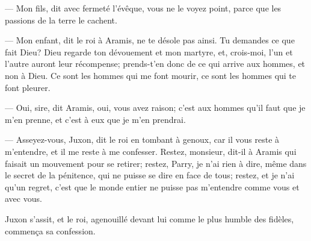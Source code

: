 — Mon fils, dit avec fermeté l'évêque, vous ne le voyez point, parce que les passions de la terre le cachent.

— Mon enfant, dit le roi à Aramis, ne te désole pas ainsi. Tu demandes ce que fait Dieu? Dieu regarde ton dévouement et mon martyre, et, crois-moi, l'un et l'autre auront leur récompense; prends-t'en donc de ce qui arrive aux hommes, et non à Dieu. Ce sont les hommes qui me font mourir, ce sont les hommes qui te font pleurer.

— Oui, sire, dit Aramis, oui, vous avez raison; c'est aux hommes qu'il faut que je m'en prenne, et c'est à eux que je m'en prendrai.

— Asseyez-vous, Juxon, dit le roi en tombant à genoux, car il vous reste à m'entendre, et il me reste à me confesser. Restez, monsieur, dit-il à Aramis qui faisait un mouvement pour se retirer; restez, Parry, je n'ai rien à dire, même dans le secret de la pénitence, qui ne puisse se dire en face de tous; restez, et je n'ai qu'un regret, c'est que le monde entier ne puisse pas m'entendre comme vous et avec vous.

Juxon s'assit, et le roi, agenouillé devant lui comme le plus humble des fidèles, commença sa confession.